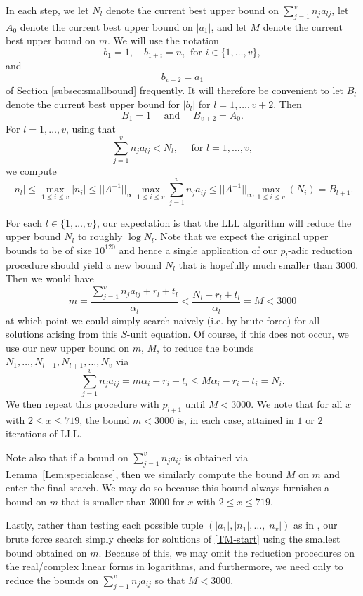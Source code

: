 {In each step, we let $N_l$ denote the current best upper bound on $\sum_{j = 1}^v n_ja_{lj}$, let $A_0$ denote the current best upper bound on $|a_1|$, and let $M$ denote the current best upper bound on $m$. We will use the notation 
\[b_1 = 1, \quad b_{1+i} = n_i \ \text{ for } i \in \{1, \dots, v\},\]
and
\[ b_{v+2} = a_1\]
of Section \ref{subsec:smallbound} frequently. It will therefore be convenient to let $B_l$ denote the current best upper bound for $|b_l|$ for $l = 1, \dots, v+2$. Then
\[B_1 = 1 \quad \text{ and } \quad B_{v+2} = A_0.\]
For $l = 1, \dots, v$, using that
\[ \sum_{j = 1}^v n_ja_{lj} < N_l, \quad \text{ for } l = 1, \dots, v,\]
we compute
\[|n_l| \leq \max_{1 \leq i \leq v}|n_i| \leq ||A^{-1}||_{\infty}\max_{1 \leq i\leq v}\sum_{j = 1}^v n_j a_{ij}
\leq ||A^{-1}||_{\infty} \max_{1 \leq i\leq v}(N_i) = B_{l+1}.\]

For each $l \in \{1, \dots, v\}$, our expectation is that the LLL algorithm will reduce the upper bound $N_l$ to roughly $\log{N_l}$. Note that we expect the original upper bounds to be of size $10^{120}$ and hence a single application of our $p_l$-adic reduction procedure should yield a new bound $N_l$ that is hopefully much smaller than $3000$. Then we would have
$$
m = \frac{\sum_{j = 1}^{v}n_ja_{lj} + r_l + t_l}{\alpha_l} < \frac{N_l+ r_l + t_l}{\alpha_l} = M < 3000
$$
at which point we could simply search naively (i.e. by brute force)  for all solutions arising from this $S$-unit equation. Of course, if this does not occur, we use our new upper bound on $m$, $M$, to reduce the bounds $N_1, \dots, N_{l-1}, N_{l+1}, \dots, N_v$ via
\[\sum_{j=1}^v n_ja_{ij} = m\alpha_i - r_i - t_i \leq M\alpha_i - r_i - t_i = N_i.\]
We then repeat this procedure with $p_{l+1}$ until $M < 3000$. We note that for all $x$ with $2 \leq x \leq 719$, the bound $m < 3000$ is, in each case, attained in $1$ or $2$ iterations of LLL.

Note also that if a bound on $\sum_{j = 1}^v n_ja_{ij}$ is obtained via Lemma~\ref{Lem:specialcase}, then we similarly compute the bound $M$ on $m$ and enter the final search. We may do so because this bound always furnishes a bound on $m$ that is smaller than $3000$ for $x$ with $2 \leq x \leq 719$. 

Lastly, rather than testing each possible tuple $(|a_1|,|n_1|, \dots, |n_v|)$ as in \cite{TW3}, our brute force search simply checks for solutions of \eqref{TM-start} using the smallest bound obtained on $m$. Because of this, we may omit the reduction procedures on the real/complex linear forms in logarithms, and furthermore, we need only to reduce the bounds on $\sum_{j = 1}^v n_ja_{ij}$ so that $M < 3000$. 

}
